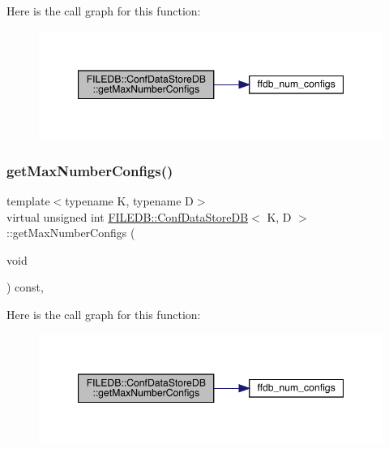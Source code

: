 Here is the call graph for this function\+:
\nopagebreak
\begin{figure}[H]
\begin{center}
\leavevmode
\includegraphics[width=347pt]{d8/d19/classFILEDB_1_1ConfDataStoreDB_a89337b5034d8f87b4a37ceb05ea99d3a_cgraph}
\end{center}
\end{figure}
\mbox{\label{classFILEDB_1_1ConfDataStoreDB_a89337b5034d8f87b4a37ceb05ea99d3a}} 
\subsubsection{\texorpdfstring{getMaxNumberConfigs()}{getMaxNumberConfigs()}\hspace{0.1cm}{\footnotesize\ttfamily [2/2]}}
{\footnotesize\ttfamily template$<$typename K, typename D$>$ \\
virtual unsigned int \mbox{\hyperlink{classFILEDB_1_1ConfDataStoreDB}{F\+I\+L\+E\+D\+B\+::\+Conf\+Data\+Store\+DB}}$<$ K, D $>$\+::get\+Max\+Number\+Configs (\begin{DoxyParamCaption}\item[{void}]{ }\end{DoxyParamCaption}) const\hspace{0.3cm}{\ttfamily [inline]}, {\ttfamily [virtual]}}

Here is the call graph for this function\+:
\nopagebreak
\begin{figure}[H]
\begin{center}
\leavevmode
\includegraphics[width=347pt]{d8/d19/classFILEDB_1_1ConfDataStoreDB_a89337b5034d8f87b4a37ceb05ea99d3a_cgraph}
\end{center}
\end{figure}
\mbox{\label{classFILEDB_1_1ConfDataStoreDB_a0fc37111156b6c7080ff6a6831c847fc}} 
